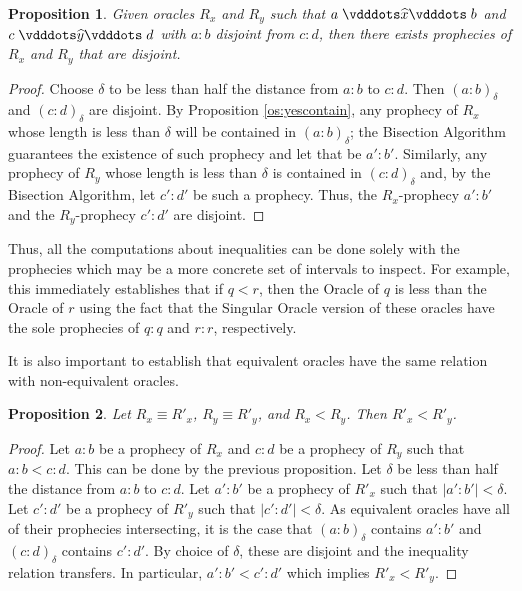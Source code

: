 \documentclass[12pt]{article}
\newtheorem{proposition}{Proposition}[section]
\begin{document}
\begin{proposition}
    Given oracles $R_x$ and $R_y$ such that $a \xora b$ and $c \xora[y] d$ with $a:b$ disjoint from $c:d$, then there exists prophecies of $R_x$ and $R_y$ that are disjoint. 
\end{proposition}

\begin{proof}
    Choose $\delta$ to be less than half the distance from $a:b$ to $c:d$. Then $(a:b)_\delta$ and $(c:d)_\delta$ are disjoint. By Proposition \ref{os:yescontain}, any prophecy of $R_x$ whose length is less than $\delta$ will be contained in $(a:b)_\delta$; the Bisection Algorithm guarantees the existence of such prophecy and let that be $a':b'$. Similarly, any prophecy of $R_y$ whose length is less than $\delta$ is contained in $(c:d)_\delta$ and, by the Bisection Algorithm, let $c':d'$ be such a prophecy. Thus, the $R_x$-prophecy $a':b'$ and the $R_y$-prophecy $c':d'$ are disjoint. 
\end{proof}

Thus, all the computations about inequalities can be done solely with the prophecies which may be a more concrete set of intervals to inspect. For example, this immediately establishes that if $q < r$, then the Oracle of $q$ is less than the Oracle of $r$ using the fact that the Singular Oracle version of these oracles have the sole prophecies of $q:q$ and $r:r$, respectively. 

It is also important to establish that equivalent oracles have the same relation with non-equivalent oracles. 

\begin{proposition}
    Let $R_x \equiv R'_x$, $R_y \equiv R'_y$, and $R_x < R_y$. Then $R'_x < R'_y$.
\end{proposition}

\begin{proof}
    Let $a:b$ be a prophecy of $R_x$ and $c:d$ be a prophecy of $R_y$ such that $a:b < c:d$. This can be done by the previous proposition. Let $\delta$ be less than half the distance from $a:b$ to $c:d$. Let $a':b'$ be a prophecy of $R'_x$ such that $|a':b'|< \delta$. Let $c':d'$ be a prophecy of $R'_y$ such that $|c':d'| < \delta$. As equivalent oracles have all of their prophecies intersecting, it is the case that $(a:b)_\delta$ contains $a':b'$ and $(c:d)_\delta$ contains $c':d'$. By choice of $\delta$, these are disjoint and the inequality relation transfers. In particular, $a':b' < c':d'$ which implies $R'_x < R'_y$. 
\end{proof}
\end{document}
